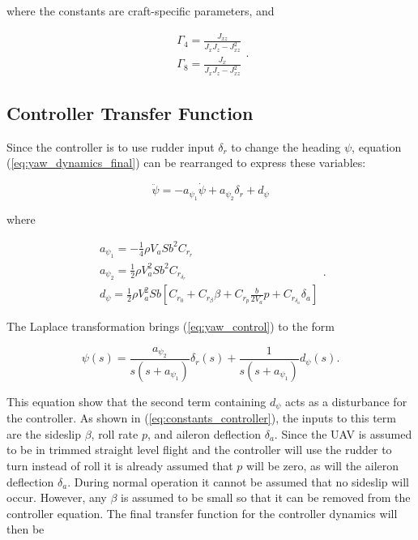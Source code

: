 where the constants are craft-specific parameters, and

\begin{equation}
\begin{gathered}
	\Gamma_4 = \frac{J_{xz}}{J_xJ_z-J_{xz}^2}
	\\
	\Gamma_8 = \frac{J_x}{J_xJ_z-J_{xz}^2}
\end{gathered}
.
\end{equation}


\subsection{Controller Transfer Function}
Since the controller is to use rudder input $\delta_r$ to change the heading $\psi$, equation (\ref{eq:yaw_dynamics_final}) can be rearranged to express these variables:

\begin{equation}
	\label{eq:yaw_control}
	\ddot{\psi} = -a_{\psi_1}\dot{\psi} + a_{\psi_2}\delta_r + d_\psi
\end{equation}

where

\begin{equation}
\begin{gathered}
	\label{eq:constants_controller}
	a_{\psi_1} = -\frac{1}{4}\rho V_aSb^2C_{r_r}
	\\
	a_{\psi_2} = \frac{1}{2}\rho V_a^2Sb^2C_{r_{\delta_r}}
	\\
	d_\psi = \frac{1}{2}\rho V_a^2Sb[C_{r_0} + C_{r_\beta}\beta + C_{r_p}\frac{b}{2V_a}p + C_{r_{\delta_a}}\delta_a]
\end{gathered}
.
\end{equation}

The Laplace transformation brings (\ref{eq:yaw_control}) to the form

\begin{equation}
	\label{eq:yaw_controller_s}
	\psi(s) = \frac{a_{\psi_2}}{s(s+a_{\psi_1})}\delta_r(s) + \frac{1}{s(s+a_{\psi_1})}d_\psi(s).
\end{equation}

This equation show that the second term containing $d_\psi$ acts as a disturbance for the controller. As shown in (\ref{eq:constants_controller}), the inputs to this term are the sideslip $\beta$, roll rate $p$, and aileron deflection $\delta_a$. Since the UAV is assumed to be in trimmed straight level flight and the controller will use the rudder to turn instead of roll it is already assumed that $p$ will be zero, as will the aileron deflection $\delta_a$. During normal operation it cannot be assumed that no sideslip will occur. However, any $\beta$ is assumed to be small so that it can be removed from the controller equation. The final transfer function for the controller dynamics will then be

